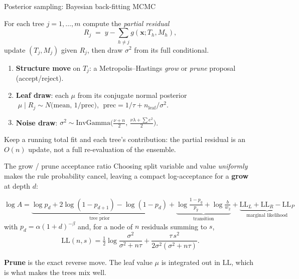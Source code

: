 \documentclass[11pt,aspectratio=169]{beamer}
\begin{document}
\begin{frame}{Posterior sampling: Bayesian back-fitting MCMC}
  \begin{thmbox}
   For each tree $j=1,\dots,m$ compute the \emph{partial residual}
   \[
     R_j \;=\; y-\sum_{h\neq j} g(\bm x;T_h,M_h),
   \]
   update $(T_j,M_j)$ given $R_j$, then draw $\sigma^2$ from its full conditional.
  \end{thmbox}
  \begin{enumerate}\small
    \item \textbf{Structure move} on $T_j$: a Metropolis--Hastings \emph{grow} or
          \emph{prune} proposal (accept/reject).
    \item \textbf{Leaf draw}: each $\mu$ from its conjugate normal posterior
          $\;\mu\mid R_j\sim N\!\big(\text{mean},\,1/\text{prec}\big)$,
          $\;\text{prec}=1/\tau+n_{\text{leaf}}/\sigma^2$.
    \item \textbf{Noise draw}: $\sigma^2\sim\text{InvGamma}\!\big(\tfrac{\nu+n}{2},\,
          \tfrac{\nu\lambda+\sum e^2}{2}\big)$.
  \end{enumerate}
  \begin{keybox}[Efficiency]
    Keep a running total fit and each tree's contribution: the partial residual
    is an $O(n)$ update, not a full re-evaluation of the ensemble.
  \end{keybox}
\end{frame}

\begin{frame}{The grow / prune acceptance ratio}
  Choosing split variable and value \emph{uniformly} makes the rule probability
  cancel, leaving a compact log-acceptance for a \textbf{grow} at depth $d$:
  \begin{thmbox}
   \[
     \log A=\underbrace{\log p_d+2\log(1{-}p_{d+1})-\log(1{-}p_d)}_{\text{tree prior}}
     +\underbrace{\log\tfrac{1-p_g}{p_g}+\log\tfrac{b}{w_2}}_{\text{transition}}
     +\underbrace{\mathrm{LL}_L+\mathrm{LL}_R-\mathrm{LL}_P}_{\text{marginal likelihood}}
   \]
   with $p_d=\alpha(1+d)^{-\beta}$ and, for a node of $n$ residuals summing to $s$,
   \[
     \mathrm{LL}(n,s)=\tfrac12\log\!\frac{\sigma^2}{\sigma^2+n\tau}
     +\frac{\tau\,s^2}{2\sigma^2(\sigma^2+n\tau)} .
   \]
  \end{thmbox}
  \textbf{Prune} is the exact reverse move. The leaf value $\mu$ is integrated out
  in $\mathrm{LL}$, which is what makes the trees mix well.
\end{frame}
\end{document}
